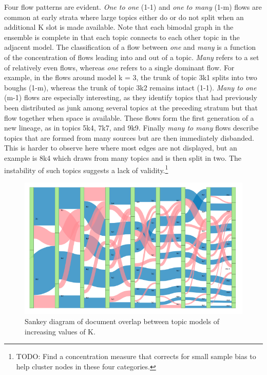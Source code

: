 \documentclass[]{book}
\let\rmarkdownfootnote\footnote%
\def\footnote{\protect\rmarkdownfootnote}
\theoremstyle{definition}
\theoremstyle{definition}
\theoremstyle{definition}
\theoremstyle{remark}
\begin{document}
Four flow patterns are evident. \emph{One to one} (1-1) and \emph{one to
many} (1-m) flows are common at early strata where large topics either
do or do not split when an additional K slot is made available. Note
that each bimodal graph in the ensemble is complete in that each topic
connects to each other topic in the adjacent model. The classification
of a flow between \emph{one} and \emph{many} is a function of the
concentration of flows leading into and out of a topic. \emph{Many}
refers to a set of relatively even flows, whereas \emph{one} refers to a
single dominant flow. For example, in the flows around model k = 3, the
trunk of topic 3k1 splits into two boughs (1-m), whereas the trunk of
topic 3k2 remains intact (1-1). \emph{Many to one} (m-1) flows are
especially interesting, as they identify topics that had previously been
distributed as junk among several topics at the preceding stratum but
that flow together when space is available. These flows form the first
generation of a new lineage, as in topics 5k4, 7k7, and 9k9. Finally
\emph{many to many} flows describe topics that are formed from many
sources but are then immediately disbanded. This is harder to observe
here where most edges are not displayed, but an example is 8k4 which
draws from many topics and is then split in two. The instability of such
topics suggests a lack of validity.\footnote{TODO: Find a concentration
  measure that corrects for small sample bias to help cluster nodes in
  these four categories.}

\begin{figure}

{\centering \includegraphics[width=1\linewidth]{img/genre-sankey} 

}

\caption{Sankey diagram of document overlap between topic models of increasing values of K.}\label{fig:sankey}
\end{figure}
\end{document}
